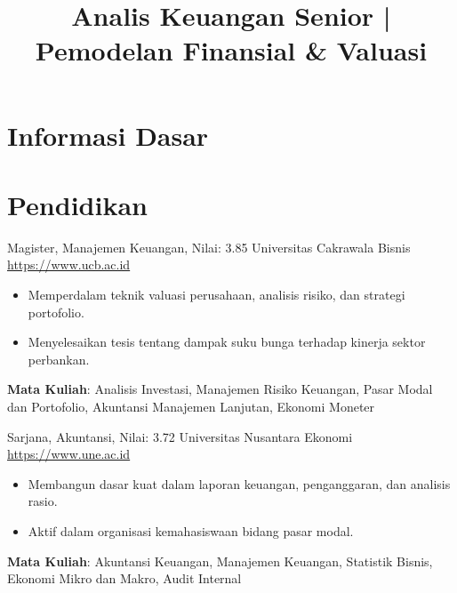 \documentclass[a4paper, serif, 10pt]{moderncv}
\title{Analis Keuangan Senior | Pemodelan Finansial \& Valuasi}
\begin{document}
\maketitle

\section{Informasi Dasar}

\section{Pendidikan}

        {Magister, Manajemen Keuangan, Nilai: 3.85}
        {Universitas Cakrawala Bisnis}
        {\url{https://www.ucb.ac.id}}
        {}
        {\begin{itemize}
\item Memperdalam teknik valuasi perusahaan, analisis risiko, dan strategi portofolio.
\item Menyelesaikan tesis tentang dampak suku bunga terhadap kinerja sektor perbankan.
\end{itemize}
\textbf{Mata Kuliah}: Analisis Investasi, Manajemen Risiko Keuangan, Pasar Modal dan Portofolio, Akuntansi Manajemen Lanjutan, Ekonomi Moneter}

        {Sarjana, Akuntansi, Nilai: 3.72}
        {Universitas Nusantara Ekonomi}
        {\url{https://www.une.ac.id}}
        {}
        {\begin{itemize}
\item Membangun dasar kuat dalam laporan keuangan, penganggaran, dan analisis rasio.
\item Aktif dalam organisasi kemahasiswaan bidang pasar modal.
\end{itemize}
\textbf{Mata Kuliah}: Akuntansi Keuangan, Manajemen Keuangan, Statistik Bisnis, Ekonomi Mikro dan Makro, Audit Internal}
\end{document}
